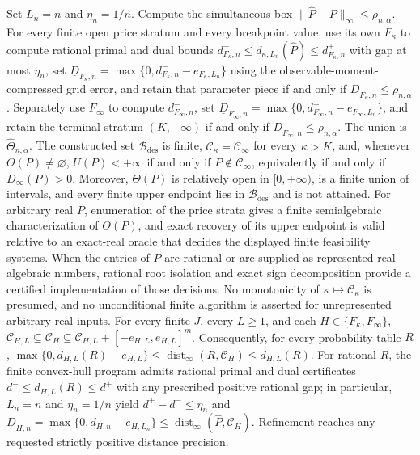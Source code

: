 Set \(L_n=n\) and \(\eta_n=1/n\).  Compute the simultaneous box \(\|\widehat P-P\|_\infty\le\rho_{n,\alpha}\).  For every finite open price stratum and every breakpoint value, use its own \(F_\kappa\) to compute rational primal and dual bounds \(d^-_{F_\kappa,n}\le d_{\kappa,L_n}(\widehat P)\le d^+_{F_\kappa,n}\) with gap at most \(\eta_n\), set \(\underline D_{F_\kappa,n}=\max\{0,d^-_{F_\kappa,n}-e_{F_\kappa,L_n}\}\) using the observable-moment-compressed grid error, and retain that parameter piece if and only if \(\underline D_{F_\kappa,n}\le\rho_{n,\alpha}\).  Separately use \(F_\infty\) to compute \(d^-_{F_\infty,n}\), set \(\underline D_{F_\infty,n}=\max\{0,d^-_{F_\infty,n}-e_{F_\infty,L_n}\}\), and retain the terminal stratum \((K,+\infty)\) if and only if \(\underline D_{F_\infty,n}\le\rho_{n,\alpha}\).  The union is \(\widehat\Theta_{n,\alpha}\).
The constructed set \(\mathcal B_{\mathrm{des}}\) is finite, \(\mathcal C_\kappa=\mathcal C_\infty\) for every \(\kappa>K\), and, whenever \(\Theta(P)\ne\varnothing\), \(U(P)<+\infty\) if and only if \(P\notin\mathcal C_\infty\), equivalently if and only if \(D_\infty(P)>0\).  Moreover, \(\Theta(P)\) is relatively open in \([0,+\infty)\), is a finite union of intervals, and every finite upper endpoint lies in \(\mathcal B_{\mathrm{des}}\) and is not attained.  For arbitrary real \(P\), enumeration of the price strata gives a finite semialgebraic characterization of \(\Theta(P)\), and exact recovery of its upper endpoint is valid relative to an exact-real oracle that decides the displayed finite feasibility systems.  When the entries of \(P\) are rational or are supplied as represented real-algebraic numbers, rational root isolation and exact sign decomposition provide a certified implementation of those decisions.  No monotonicity of \(\kappa\mapsto\mathcal C_\kappa\) is presumed, and no unconditional finite algorithm is asserted for unrepresented arbitrary real inputs.
For every finite \(J\), every \(L\ge1\), and each \(H\in\{F_\kappa,F_\infty\}\), \(\mathcal C_{H,L}\subseteq\mathcal C_H\subseteq\mathcal C_{H,L}+[-e_{H,L},e_{H,L}]^m\).  Consequently, for every probability table \(R\), \(\max\{0,d_{H,L}(R)-e_{H,L}\}\le\operatorname{dist}_\infty(R,\mathcal C_H)\le d_{H,L}(R)\).  For rational \(R\), the finite convex-hull program admits rational primal and dual certificates \(d^-\le d_{H,L}(R)\le d^+\) with any prescribed positive rational gap; in particular, \(L_n=n\) and \(\eta_n=1/n\) yield \(d^+-d^-\le\eta_n\) and \(\underline D_{H,n}=\max\{0,d^-_{H,n}-e_{H,L_n}\}\le\operatorname{dist}_\infty(\widehat P,\mathcal C_H)\).  Refinement reaches any requested strictly positive distance precision.
